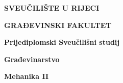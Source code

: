 \thispagestyle{empty}

\vspace{\baselineskip}
\begin{Center}
	{\fontsize{14pt}{16.8pt}\selectfont \textbf{SVEUČILIŠTE U RIJECI}\par}
\end{Center}\par

\begin{Center}
	{\fontsize{14pt}{16.8pt}\selectfont \textbf{GRAĐEVINSKI FAKULTET}\par}
\end{Center}\par


\vspace{\baselineskip}
\begin{Center}
	{\fontsize{14pt}{16.8pt}\selectfont \textbf{Prijediplomski Sveučilišni studij}\par}
\end{Center}\par

\begin{Center}
	{\fontsize{14pt}{16.8pt}\selectfont \textbf{Građevinarstvo}\par}
\end{Center}\par

\begin{Center}
	{\fontsize{14pt}{16.8pt}\selectfont \textbf{ {Mehanika II} }\par}
\end{Center}\par


%
%
%
%
%
%
%
%
%
%
%

\vskip 144pt

